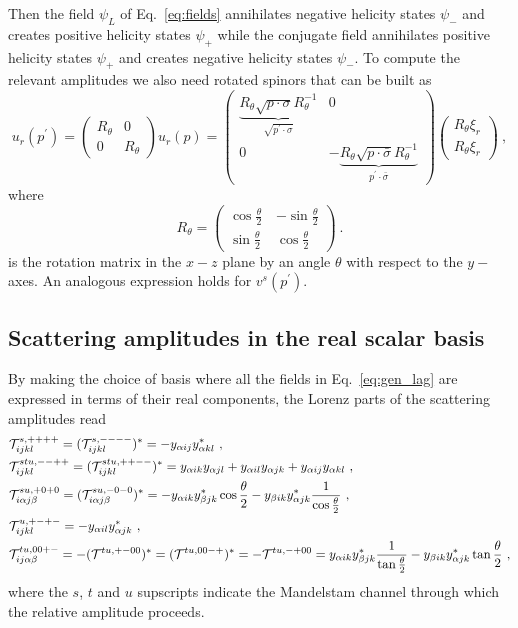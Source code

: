 \documentclass[a4paper,11pt]{article}
\newcommand{\be}{\begin{equation}}
\newcommand{\ee}{\end{equation}}
\newcommand{\nn}{\nonumber}
\begin{document}
Then the field $\psi_L$ of Eq.~\eqref{eq:fields} annihilates negative helicity states $\psi_-$ and creates positive helicity states $\psi_+$ while the conjugate field annihilates positive helicity states $\psi_+$ and creates negative helicity states $\psi_-$. To compute the relevant amplitudes we also need rotated spinors that can be built as
\be
u_r(p^\prime) = 
\begin{pmatrix}
R_\theta & 0 \\
0 & R_\theta
\end{pmatrix}
u_r(p) = 
\begin{pmatrix}
\underbrace{R_\theta \sqrt{p\cdot \sigma}R^{-1}_\theta}_{\sqrt{p^\prime\cdot \sigma}} & 0 \\
0 & - \underbrace{R_\theta \sqrt{p\cdot \bar \sigma}R^{-1}_\theta}_{p^\prime\cdot \bar \sigma}
\end{pmatrix}
\begin{pmatrix}
R_\theta \xi_r \\
R_\theta \xi_r
\end{pmatrix} \ ,
\ee
where
\be
R_\theta  =
\begin{pmatrix}
\cos\frac{\theta}{2}\, & - \sin\frac{\theta}{2} \\
\sin\frac{\theta}{2}\, & \cos\frac{\theta}{2}
\end{pmatrix} \ .
\ee
is the rotation matrix in the $x-z$ plane by an angle $\theta$ with respect to the $y-$axes. An analogous expression holds for $v^s(p^\prime)$.

\subsection{Scattering amplitudes in the real scalar basis}

By making the choice of basis where all the fields in Eq.~\eqref{eq:gen_lag} are expressed in terms of their real components, the Lorenz parts of the scattering amplitudes read
\begin{align}\label{eq:amp}
&{\cal{T}}^{s,++++}_{ijkl}  = ({\cal{T}}^{s,----}_{ijkl})^*= -y_{\alpha i j} y_{\alpha k l }^*\ ,  \nn \\ 
&{\cal{T}}^{stu,--++}_{ijkl}  = ({\cal{T}}^{stu,++--}_{ijkl})^* =y_{\alpha i k} y_{\alpha j l }+y_{\alpha i l} y_{\alpha j k }+y_{\alpha i j} y_{\alpha kl } \ , \nn \\
%
&{\cal{T}}^{su,+0+0}_{i \alpha j \beta}  = ({\cal{T}}^{su,-0-0}_{i \alpha j \beta})^*= -y_{\alpha i k} y_{\beta j k }^* \cos\frac{\theta}{2} - y_{\beta i k} y_{\alpha j k }^*\frac{1}{\cos\frac{\theta}{2}} \ , \nn \\
&{\cal{T}}^{u,+-+-}_{ijkl}  = -y_{\alpha i l} y_{\alpha j k}^*\ , \nn \\
%
& {\cal{T}}^{tu,00+-}_{ij \alpha \beta}= -({\cal{T}}^{tu,+-00})^*=({\cal{T}}^{tu,00-+})^*= -{\cal{T}}^{tu,-+00}=   y_{\alpha i k} y_{\beta j k}^*\frac{1}{\tan{\frac{\theta}{2}}}-y_{\beta i k} y_{\alpha j k}^*\tan{\frac{\theta}{2}} \ ,
\end{align}
where the $s$, $t$ and $u$ supscripts indicate the Mandelstam channel through which the relative amplitude proceeds. 
\end{document}

